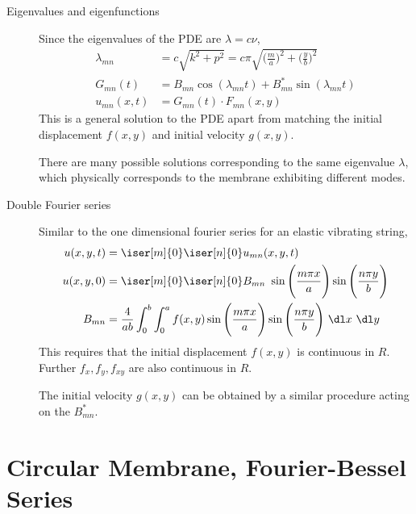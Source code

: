 \begin{description}
    \item[Eigenvalues and eigenfunctions] Since the eigenvalues of the PDE are
        $ \lambda = c\nu $,
        \begin{align}
            \lambda_{mn} & = c\sqrt{k^2 + p^2} = c\pi
            \sqrt{\Bigg(\frac{m}{a}\Bigg)^2 + \Bigg(\frac{y}{b}\Bigg)^2}               \\
            G_{mn}(t)    & = B_{mn} \cos(\lambda_{mn} t) + B^*_{mn}\sin(\lambda_{mn}t) \\
            u_{mn}(x, t) & = G_{mn}(t) \cdot F_{mn}(x, y)
        \end{align}
        This is a general solution to the PDE apart from matching the initial
        displacement $ f(x, y) $ and initial velocity $ g(x, y) $. \par
        There are many possible solutions corresponding to the same eigenvalue
        $ \lambda $, which physically corresponds to the membrane exhibiting different
        modes.

    \item[Double Fourier series] Similar to the one dimensional fourier series for an
        elastic vibrating string,
        \begin{align}
            u(x, y, t) & = \iser[m]{0} \iser[n]{0} u_{mn}(x, y, t)               \\
            u(x, y, 0) & = \iser[m]{0} \iser[n]{0} B_{mn}\
            \sin\Bigg( \frac{m\pi x}{a} \Bigg) \sin\Bigg( \frac{n\pi y}{b}\Bigg) \\
            B_{mn}     & = \frac{4}{ab} \int_{0}^{b} \int_{0}^{a} f(x, y)
            \sin\Bigg( \frac{m\pi x}{a} \Bigg) \sin\Bigg( \frac{n\pi y}{b}\Bigg)
            \ \dl x\ \dl y
        \end{align}
        This requires that the initial displacement $ f(x, y) $ is continuous in $ R $.
        Further $ f_x, f_y, f_{xy} $ are also continuous in $ R $. \par
        The initial velocity $ g(x, y) $ can be obtained by a similar procedure acting
        on the $ B^*_{mn} $.
\end{description}

\section{Circular Membrane, Fourier-Bessel Series}

